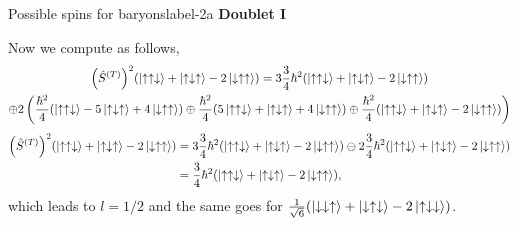 \documentclass[../main.tex]{subfiles}
\begin{document}
\begin{sol}{Possible spins for baryons}{label-2a}
    {\bfseries Doublet I}\vspace{1.5em}

    Now we compute as follows,
    \begin{multline*}
        \qty(\hat{S}^{(T)})^2\qty(\ket{\uparrow\uparrow\downarrow}+\ket{\uparrow\downarrow\uparrow}-2\ket{\downarrow\uparrow\uparrow}) = 3\frac{3}{4}\hbar^2\qty(\ket{\uparrow\uparrow\downarrow}+\ket{\uparrow\downarrow\uparrow}-2\ket{\downarrow\uparrow\uparrow}) 
                                                    \\
                                                        \oplus 2 \left(
                                                        \frac{\hbar^2}{4}\qty(\ket{\uparrow\uparrow\downarrow}-5\ket{\uparrow\downarrow\uparrow}+4\ket{\downarrow\uparrow\uparrow})
                                                        \oplus
                                                        \frac{\hbar^2}{4}\qty(5\ket{\uparrow\uparrow\downarrow}+\ket{\uparrow\downarrow\uparrow}+4\ket{\downarrow\uparrow\uparrow})
                                                        \oplus
                                                        \frac{\hbar^2}{4}\qty(\ket{\uparrow\uparrow\downarrow}+\ket{\uparrow\downarrow\uparrow}-2\ket{\downarrow\uparrow\uparrow})
                                                    \right)
    \end{multline*}
    \begin{align*}
        \qty(\hat{S}^{(T)})^2\qty(\ket{\uparrow\uparrow\downarrow}+\ket{\uparrow\downarrow\uparrow}-2\ket{\downarrow\uparrow\uparrow}) &= 3\frac{3}{4}\hbar^2\qty(\ket{\uparrow\uparrow\downarrow}+\ket{\uparrow\downarrow\uparrow}-2\ket{\downarrow\uparrow\uparrow}) \ominus 2\frac{3}{4}\hbar^2\qty(\ket{\uparrow\uparrow\downarrow}+\ket{\uparrow\downarrow\uparrow}-2\ket{\downarrow\uparrow\uparrow}) \\
                                                                                         &= \frac{3}{4}\hbar^2\qty(\ket{\uparrow\uparrow\downarrow}+\ket{\uparrow\downarrow\uparrow}-2\ket{\downarrow\uparrow\uparrow}),
    \end{align*}
    which leads to $l=1/2$ and the same goes for $\frac{1}{\sqrt{6}}\qty(\ket{\downarrow\downarrow\uparrow}+\ket{\downarrow\uparrow\downarrow}-2\ket{\uparrow\downarrow\downarrow})$. \\


\end{sol}
\end{document}
